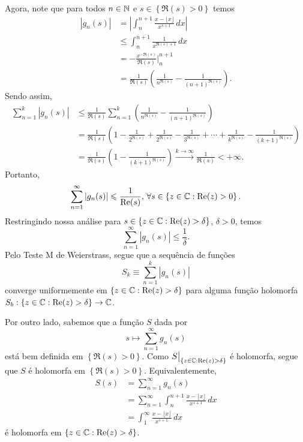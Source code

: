 \begin{exemplo}
Agora, note que para todos $n\in\mathbb{N}$ e $s\in\left\{ \Re(s) > 0 \right\}$ temos
%
\begin{align*}
    |g_n(s)| &= \left| \int_n^{n+1} \frac{x - \lfloor x \rfloor}{x^{s+1}} \, dx \right| \\
             &\leq \int_n^{n+1} \frac{1}{x^{\Re(s) + 1}} \, dx \\
             &= -\frac{x^{-\Re(s)}}{\Re(s)}\Bigg|_n^{n+1} \\
             &= \frac{1}{\Re(s)}\left( \frac{1}{n^{\Re(s)}} - \frac{1}{(n+1)^{\Re(s)}} \right).
\end{align*}
%
Sendo assim,
%
\begin{align*}
    \sum_{n=1}^k |g_n(s)| 
    &\leq \frac{1}{\Re(s)}\sum_{n=1}^k\left( \frac{1}{n^{\Re(s)}} - \frac{1}{(n+1)^{\Re(s)}} \right) \\
    &= \frac{1}{\Re(s)} 
    \left( 1 - \frac{1}{2^{\Re(s)}} 
    + \frac{1}{2^{\Re(s)}} - \frac{1}{3^{\Re(s)}} 
    + \cdots +
    \frac{1}{k^{\Re(s)}} - \frac{1}{(k+1)^{\Re(s)}} \right) \\
    &= \frac{1}{\Re(s)} \left( 1 - \frac{1}{(k+1)^{\Re(s)}} \right) 
    \xrightarrow{k\to\infty} \frac{1}{\Re(s)} < +\infty.
\end{align*}
%
Portanto,
%
\[
\sum_{n=1}^{\infty} |g_n(s)| \leqslant \frac{1}{\mathrm{Re}(s)}, \, 
\forall s\in\left\{ z\in\mathbb{C} : \mathrm{Re}(z) > 0 \right\}.
\]
%
Restringindo nossa análise para $s\in\left\{ z\in\mathbb{C} : \mathrm{Re}(z) > \delta \right\}$, $\delta > 0$,
temos
%
\[
\sum_{n=1}^{\infty} |g_n(s)| \leq \frac{1}{\delta}.
\]
%
Pelo Teste M de Weierstrass, segue que a sequência de funções
%
\[
S_k \equiv \sum_{n=1}^{k} |g_n(s)|
\]
%
converge uniformemente em $\left\{ z\in\mathbb{C} : \mathrm{Re}(z) > \delta \right\}$ para alguma função
holomorfa $S_b: \left\{ z\in\mathbb{C} : \mathrm{Re}(z) > \delta \right\} \to \mathbb{C}$.

Por outro lado, sabemos que a função $S$ dada por
%
\[
s \mapsto \sum_{n=1}^{\infty} g_n(s)
\]
%
está bem definida em $\left\{\Re(s) > 0 \right\}$. Como 
$S\big|_{\left\{ z\in\mathbb{C} : \mathrm{Re}(z) > \delta \right\}}$ é holomorfa, segue que $S$ é holomorfa em
$\left\{\Re(s) > 0 \right\}$. Equivalentemente,
%
\begin{align*}
    S(s) &= \sum_{n=1}^{\infty} g_n(s) \\
         &= \sum_{n=1}^{\infty} \int_n^{n+1} \frac{x - \lfloor x \rfloor}{x^{s+1}} \, dx \\
         &= \int_1^{\infty} \frac{x - \lfloor x \rfloor}{x^{s+1}} \, dx
\end{align*}
%
é holomorfa em $\left\{ z\in\mathbb{C} : \mathrm{Re}(z) > \delta \right\}$.
\end{exemplo}
%